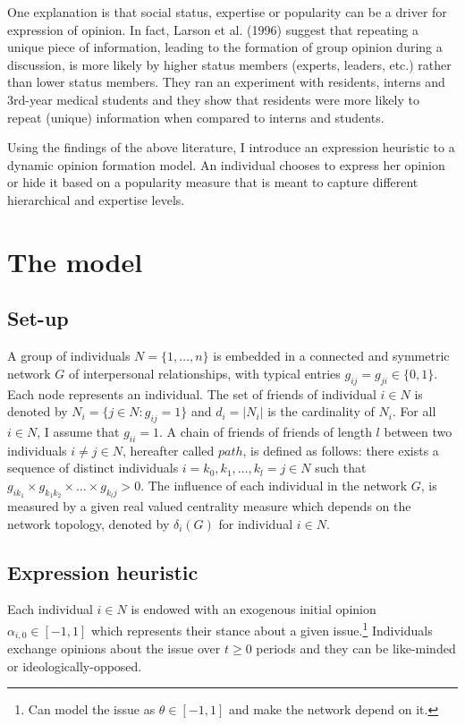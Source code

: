 \documentclass{article}
\begin{document}
One explanation is that social status, expertise or popularity can be a driver for expression of opinion. In fact, Larson et al. (1996)\cite{larson} suggest that repeating a unique piece of information, leading to the formation of group opinion during a discussion, is more likely by higher status members (experts, leaders, etc.) rather than lower status members. They ran an experiment with residents, interns and 3rd-year medical students and they show that residents were more likely to repeat (unique) information when compared to interns and students.

Using the findings of the above literature, I introduce an expression heuristic to a dynamic opinion formation model. An individual chooses to express her opinion or hide it based on a  popularity measure that is meant to capture different hierarchical and expertise levels. 



\section{The model} \label{themodel}

\subsection{Set-up} \label{setup}
A group of individuals $N=\{1, \ldots , n\}$ is embedded in a connected and symmetric network $G$ of interpersonal relationships, with typical entries $g_{ij} = g_{ji}  \in \{ 0,1\}$. Each node represents an individual. The set of friends of individual $i \in N$ is denoted by $N_i = \{j \in N : g_{ij}=1 \}$ and $d_i = |N_i|$ is the cardinality of $N_i$. For all $i \in N$, I assume that $g_{ii} =1$. A chain of friends of friends of length $l$ between two individuals $i \neq j \in N$, hereafter called  $path$,  is defined as follows: there exists a sequence of distinct individuals $i=k_0, k_1, \ldots, k_l = j \in N$ such that $g_{ik_1} \times g_{k_1 k_2} \times \ldots \times g_{k_l j} > 0$. The influence of each individual in the network $G$, is measured by a given real valued centrality measure which depends on the network topology, denoted by $\delta_i (G)$ for individual $i \in N$. 


\subsection{Expression heuristic}

Each individual $i \in N$ is endowed with an exogenous initial opinion $\alpha_{i,0} \in [-1,1]$ which represents their stance about a given issue.\footnote{Can model the issue as $\theta \in [-1,1]$ and make the network depend on it.} Individuals exchange opinions about the issue over $t \geq 0$ periods and they can be like-minded or ideologically-opposed. 
\end{document}
